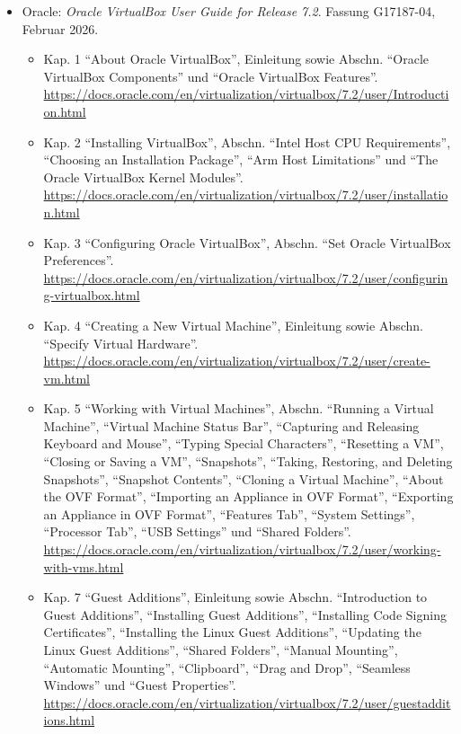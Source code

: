 \begin{itemize}[nosep]
  \item Oracle: \emph{Oracle VirtualBox User Guide for Release 7.2}. Fassung G17187-04, Februar 2026.
  \begin{itemize}[nosep]
    \item Kap. 1 \enquote{About Oracle VirtualBox}, Einleitung sowie Abschn. \enquote{Oracle VirtualBox Components} und \enquote{Oracle VirtualBox Features}. \url{https://docs.oracle.com/en/virtualization/virtualbox/7.2/user/Introduction.html}
    \item Kap. 2 \enquote{Installing VirtualBox}, Abschn. \enquote{Intel Host CPU Requirements}, \enquote{Choosing an Installation Package}, \enquote{Arm Host Limitations} und \enquote{The Oracle VirtualBox Kernel Modules}. \url{https://docs.oracle.com/en/virtualization/virtualbox/7.2/user/installation.html}
    \item Kap. 3 \enquote{Configuring Oracle VirtualBox}, Abschn. \enquote{Set Oracle VirtualBox Preferences}. \url{https://docs.oracle.com/en/virtualization/virtualbox/7.2/user/configuring-virtualbox.html}
    \item Kap. 4 \enquote{Creating a New Virtual Machine}, Einleitung sowie Abschn. \enquote{Specify Virtual Hardware}. \url{https://docs.oracle.com/en/virtualization/virtualbox/7.2/user/create-vm.html}
    \item Kap. 5 \enquote{Working with Virtual Machines}, Abschn. \enquote{Running a Virtual Machine}, \enquote{Virtual Machine Status Bar}, \enquote{Capturing and Releasing Keyboard and Mouse}, \enquote{Typing Special Characters}, \enquote{Resetting a VM}, \enquote{Closing or Saving a VM}, \enquote{Snapshots}, \enquote{Taking, Restoring, and Deleting Snapshots}, \enquote{Snapshot Contents}, \enquote{Cloning a Virtual Machine}, \enquote{About the OVF Format}, \enquote{Importing an Appliance in OVF Format}, \enquote{Exporting an Appliance in OVF Format}, \enquote{Features Tab}, \enquote{System Settings}, \enquote{Processor Tab}, \enquote{USB Settings} und \enquote{Shared Folders}. \url{https://docs.oracle.com/en/virtualization/virtualbox/7.2/user/working-with-vms.html}
    \item Kap. 7 \enquote{Guest Additions}, Einleitung sowie Abschn. \enquote{Introduction to Guest Additions}, \enquote{Installing Guest Additions}, \enquote{Installing Code Signing Certificates}, \enquote{Installing the Linux Guest Additions}, \enquote{Updating the Linux Guest Additions}, \enquote{Shared Folders}, \enquote{Manual Mounting}, \enquote{Automatic Mounting}, \enquote{Clipboard}, \enquote{Drag and Drop}, \enquote{Seamless Windows} und \enquote{Guest Properties}. \url{https://docs.oracle.com/en/virtualization/virtualbox/7.2/user/guestadditions.html}

\end{itemize}
\end{itemize}
